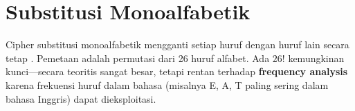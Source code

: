 \section{Substitusi Monoalfabetik}

Cipher substitusi monoalfabetik mengganti setiap huruf dengan huruf lain secara tetap \cite{trappe2006,schneier1996}. Pemetaan adalah permutasi dari 26 huruf alfabet. Ada $26!$ kemungkinan kunci---secara teoritis sangat besar, tetapi rentan terhadap \textbf{frequency analysis} karena frekuensi huruf dalam bahasa (misalnya E, A, T paling sering dalam bahasa Inggris) dapat dieksploitasi.
